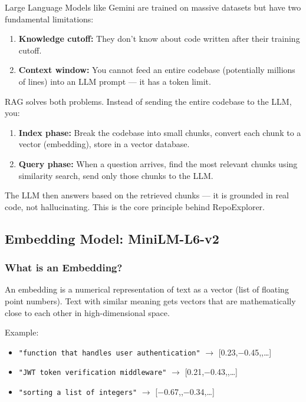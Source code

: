 \documentclass[a4paper,11pt]{article}
\begin{document}
Large Language Models like Gemini are trained on massive datasets but have two fundamental limitations:
\begin{enumerate}
    \item \textbf{Knowledge cutoff:} They don't know about code written after their training cutoff.
    \item \textbf{Context window:} You cannot feed an entire codebase (potentially millions of lines) into an LLM prompt --- it has a token limit.
\end{enumerate}

RAG solves both problems. Instead of sending the entire codebase to the LLM, you:
\begin{enumerate}
    \item \textbf{Index phase:} Break the codebase into small chunks, convert each chunk to a vector (embedding), store in a vector database.
    \item \textbf{Query phase:} When a question arrives, find the most relevant chunks using similarity search, send only those chunks to the LLM.
\end{enumerate}

The LLM then answers based on the retrieved chunks --- it is grounded in real code, not hallucinating. This is the core principle behind RepoExplorer.

\subsection{Embedding Model: MiniLM-L6-v2}

\subsubsection{What is an Embedding?}
An embedding is a numerical representation of text as a vector (list of floating point numbers). Text with similar meaning gets vectors that are mathematically close to each other in high-dimensional space.

Example:
\begin{itemize}
    \item \texttt{"function that handles user authentication"} $\rightarrow$ [0.23,\;$-$0.45,,\;\ldots]
    \item \texttt{"JWT token verification middleware"} $\rightarrow$ [0.21,\;$-$0.43,,\;\ldots]
    \item \texttt{"sorting a list of integers"} $\rightarrow$ [$-$0.67,,\;$-$0.34,\;\ldots]
\end{itemize}
\end{document}
